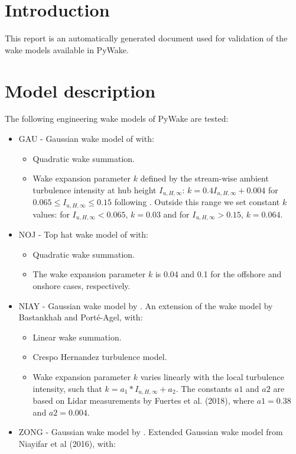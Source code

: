 \documentclass[a4paper,oneside]{article}
\begin{document}
\section{Introduction}
This report is an automatically generated document used for validation of the wake models available in PyWake.

\section{Model description}
The following engineering wake models of PyWake are tested:
\begin{itemize}
    \item GAU - Gaussian wake model of \citet{Bastankhah2014} with:
    \begin{itemize}
        \item Quadratic wake summation.
        \item Wake expansion parameter $k$ defined by the stream-wise ambient turbulence intensity at hub height $I_{u,H,\infty}$: $k=0.4 I_{u,H,\infty} + 0.004$  for $0.065 \leq I_{u,H,\infty} \leq 0.15$ following \citet{Niayifar2015}. Outside this range we set constant $k$ values: for $I_{u,H,\infty} < 0.065$, $k=0.03$ and for $I_{u,H,\infty} > 0.15$, $k=0.064$.
    \end{itemize}
    \item NOJ - Top hat wake model of \citet{Jensen83} with:
    \begin{itemize}
        \item Quadratic wake summation.
        \item The wake expansion parameter $k$ is 0.04 and 0.1 for the offshore and onshore cases, respectively.
    \end{itemize}
    \item NIAY - Gaussian wake model by \citet{Niayifar2016}. An extension of the wake model by Bastankhah and Porté-Agel, with:
    \begin{itemize}
        \item Linear wake summation.
        \item Crespo Hernandez turbulence model.
        \item 	Wake expansion parameter $k$ varies linearly with the local turbulence intensity, such that $k = a_1*I_{u,H,\infty} + a_2$. The constants $a1$ and $a2$ are based on Lidar measurements by Fuertes et al. (2018), where $a1 = 0.38$ and $a2 = 0.004$.
    \end{itemize}
    \item ZONG - Gaussian wake model by \citet{Zong2020}. Extended Gaussian wake model from Niayifar et al (2016), with:

\end{itemize}
\end{document}

